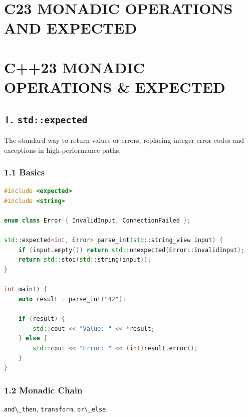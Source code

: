 \hypertarget{c23-monadic-operations-and-expected}{%
\chapter{C23 MONADIC OPERATIONS AND
EXPECTED}\label{c23-monadic-operations-and-expected}}

\hypertarget{c23-monadic-operations-expected}{%
\chapter{C++23 MONADIC OPERATIONS \&
EXPECTED}\label{c23-monadic-operations-expected}}

\hypertarget{stdexpected}{%
\section{\texorpdfstring{1.
\texttt{std::expected}}{1. std::expected}}\label{stdexpected}}

The standard way to return values or errors, replacing integer error
codes and exceptions in high-performance paths.

\hypertarget{basics}{%
\subsection{1.1 Basics}\label{basics}}

\begin{lstlisting}[language={C++}]
#include <expected>
#include <string>

enum class Error { InvalidInput, ConnectionFailed };

std::expected<int, Error> parse_int(std::string_view input) {
    if (input.empty()) return std::unexpected(Error::InvalidInput);
    return std::stoi(std::string(input));
}

int main() {
    auto result = parse_int("42");
    
    if (result) {
        std::cout << "Value: " << *result;
    } else {
        std::cout << "Error: " << (int)result.error();
    }
}
\end{lstlisting}

\hypertarget{monadic-chain}{%
\subsection{1.2 Monadic Chain}\label{monadic-chain}}

\passthrough{\lstinline!and\_then!},
\passthrough{\lstinline!transform!}, \passthrough{\lstinline!or\_else!}.

